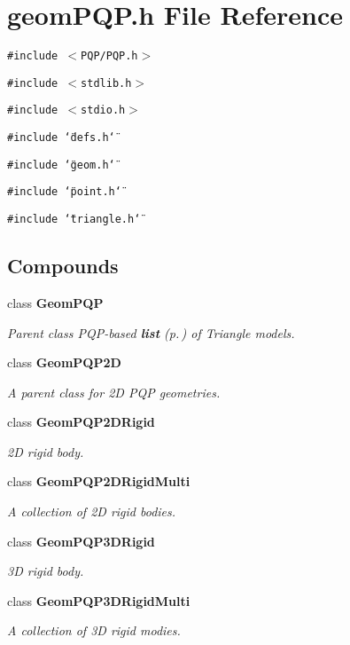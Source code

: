 \section{geom\-PQP.h File Reference}
\label{geomPQP_8h}
{\tt \#include $<$PQP/PQP.h$>$}\par
{\tt \#include $<$stdlib.h$>$}\par
{\tt \#include $<$stdio.h$>$}\par
{\tt \#include \char`\"{}defs.h\char`\"{}}\par
{\tt \#include \char`\"{}geom.h\char`\"{}}\par
{\tt \#include \char`\"{}point.h\char`\"{}}\par
{\tt \#include \char`\"{}triangle.h\char`\"{}}\par
\subsection*{Compounds}
\begin{CompactItemize}
\item 
class {\bf Geom\-PQP}
\begin{CompactList}\small\item\em Parent class PQP-based {\bf list} {\rm (p.\,\pageref{classlist})} of Triangle models.\item\end{CompactList}\item 
class {\bf Geom\-PQP2D}
\begin{CompactList}\small\item\em A parent class for 2D PQP geometries.\item\end{CompactList}\item 
class {\bf Geom\-PQP2DRigid}
\begin{CompactList}\small\item\em 2D rigid body.\item\end{CompactList}\item 
class {\bf Geom\-PQP2DRigid\-Multi}
\begin{CompactList}\small\item\em A collection of 2D rigid bodies.\item\end{CompactList}\item 
class {\bf Geom\-PQP3DRigid}
\begin{CompactList}\small\item\em 3D rigid body.\item\end{CompactList}\item 
class {\bf Geom\-PQP3DRigid\-Multi}
\begin{CompactList}\small\item\em A collection of 3D rigid modies.\item\end{CompactList}\end{CompactItemize}
